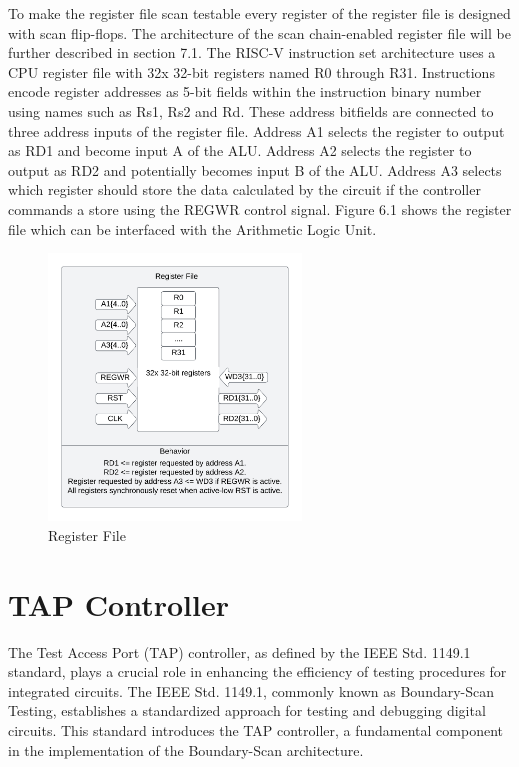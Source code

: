 To make the register file scan testable every register of the register file is designed with scan flip-flops. The architecture of the scan chain-enabled register file will be further described in section 7.1.
The RISC-V instruction set architecture uses a CPU register file with 32x 32-bit registers named R0 through R31. Instructions encode register addresses as 5-bit fields within the instruction binary number using names such as Rs1, Rs2 and Rd. These address bitfields are connected to three address inputs of the register file. Address A1 selects the register to output as RD1 and become input A of the ALU. Address A2 selects the register to output as RD2 and potentially becomes input B of the ALU. Address A3 selects which register should store the data calculated by the circuit if the controller commands a store using the REGWR control signal. Figure 6.1 shows the register file which can be interfaced with the Arithmetic Logic Unit.




\begin{figure}[h] %
  \centering
  \setlength{\abovecaptionskip}{-10pt} %
  \setlength{\belowcaptionskip}{0pt} %
  \includegraphics[width=0.6\textwidth]{Image/Register.png} %
  \caption{Register File}
  \label{Figure 1 : Register File}
\end{figure}


\pagebreak
\newpage
\section{TAP Controller}
The Test Access Port (TAP) controller, as defined by the IEEE Std. 1149.1 standard, plays a crucial role in enhancing the efficiency of testing procedures for integrated circuits. The IEEE Std. 1149.1, commonly known as Boundary-Scan Testing, establishes a standardized approach for testing and debugging digital circuits. This standard introduces the TAP controller, a fundamental component in the implementation of the Boundary-Scan architecture.
\vspace{3mm}

